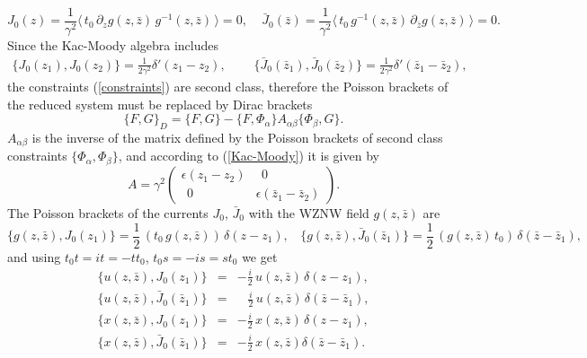 \documentclass[a4paper,12pt]{article}
\begin{document}
\begin{equation}\label{constraints}
J_0(z)=\frac{1}{\gamma^2}\langle\, t_0\, \partial_z g(z,\bar z)
\,g^{-1}(z,\bar z)\,\rangle =0,~~~~~
\bar J_0(\bar z)=\frac{1}{\gamma^2}\langle\, t_0
\,g^{-1}(z,\bar z)\,\partial_{\bar z} g(z,\bar z)\,\rangle =0.
\end{equation}
Since the Kac-Moody algebra includes
\begin{eqnarray}\label{Kac-Moody}
\{J_0(z_1), J_0(z_2)\}=
\frac{1}{2\gamma^2}\delta'(z_1-z_2),
~~~~~~~~~~
\{\bar J_0(\bar z_1),\bar J_0(\bar z_2)\}=
\frac{1}{2\gamma^2}\delta'(\bar z_1-\bar z_2),
\end{eqnarray}
the constraints (\ref{constraints}) are second class,
therefore
 the Poisson brackets of
the reduced system must be replaced by Dirac brackets \cite{Dirac}
\begin{equation}\label{DB}
\{F,G\}_D=\{F,G\}-\{F,\Phi_\alpha\}A_{\alpha\beta}\{\Phi_\beta,G\}.
\end{equation}
$A_{\alpha\beta}$ is the inverse of the matrix defined by the Poisson
brackets of second class constraints $\{\Phi_\alpha, \Phi_\beta\}$,
and according to (\ref{Kac-Moody}) it is given by
\begin{equation}\label{D^-1}
 A =\gamma^2\left( \begin{array}{cr}
  \epsilon (z_1-z_2)&~~0~~\\~~0~~&\epsilon(\bar z_1-\bar z_2) \end{array}\right).
\end{equation}
The Poisson brackets of the currents $J_0$, $\bar J_0$ with the
WZNW field $g(z,\bar z)$ are
\begin{equation}\label{PB-J-g}
\{ g(z,\bar z),J_0(z_1)\}=
\frac{1}{2}\,(t_0\,g(z,\bar z))\,\delta(z-z_1),~~~~
\{ g(z,\bar z),\bar J_0(\bar z_1)\}=
\frac{1}{2}\,(g(z,\bar z)\,t_0)\,\delta(\bar z-\bar z_1),
\end{equation}
and using $t_0t=it=-tt_0$, $t_0s=-is=st_0$ we get
\begin{eqnarray}\label{PB-g-u}
\{ u(z,\bar z),J_0(z_1)\}&=&
-\frac{i}{2}\,u(z,\bar z)\,\delta(z-z_1),\nonumber\\
\{ u(z,\bar z), \bar J_0(\bar z_1)\}&=&
\,\,\,\,\,\frac{i}{2}\,u(z,\bar z)\,\delta(\bar z-\bar z_1),\nonumber\\
\{ x(z,\bar z),J_0(z_1)\}&=&
-\frac{i}{2}\,x(z,\bar z)\,\delta(z-z_1),\nonumber\\
\{x(z,\bar z), \bar J_0(\bar z_1)\}&=&
-\frac{i}{2}\,x(z,\bar z)\delta(\bar z-\bar z_1).
\end{eqnarray}
\end{document}
